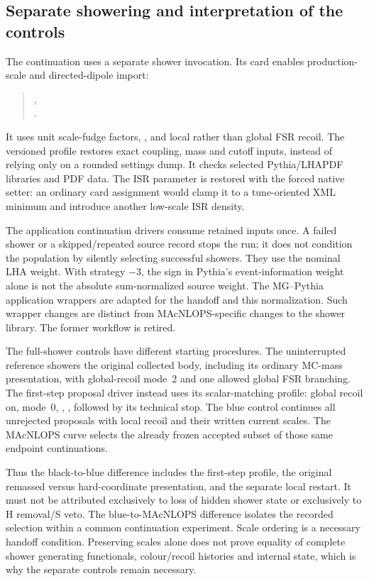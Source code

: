 \subsection{Separate showering and interpretation of the controls}
\label{sec:masses-full-shower}

The continuation uses a separate shower invocation.
Its card enables production-scale and directed-dipole import:
\begin{quote}
,\\
.
\end{quote}
It uses unit scale-fudge factors, , and local
rather than global FSR recoil.
The versioned profile restores exact coupling, mass and cutoff
inputs, instead of relying only on a rounded settings dump.
It checks selected Pythia/LHAPDF libraries and PDF data.
The ISR parameter  is restored with the
forced native setter: an ordinary card assignment would clamp it
to a tune-oriented XML minimum and introduce another low-scale
ISR density.

The application continuation drivers consume retained inputs once.
A failed shower or a skipped/repeated source record stops the run;
it does not condition the population by silently selecting successful
showers.
They use the nominal LHA weight.
With strategy $-3$, the sign in Pythia's event-information weight
alone is not the absolute sum-normalized source weight.
The MG--Pythia application wrappers are adapted for the handoff
and this normalization.
Such wrapper changes are distinct from MAcNLOPS-specific changes
to the shower library.
The former  workflow is retired.

The full-shower controls have different starting procedures.
The uninterrupted reference showers the original collected body,
including its ordinary MC-mass presentation, with global-recoil
mode~2 and one allowed global FSR branching.
The first-step proposal driver instead uses its scalar-matching
profile: global recoil on, mode~0,
,
, followed by its technical stop.
The blue control continues all unrejected proposals with local
recoil and their written current scales.
The MAcNLOPS curve selects the already frozen accepted subset
of those same endpoint continuations.

Thus the black-to-blue difference includes the first-step profile,
the original remassed versus hard-coordinate presentation, and
the separate local restart.
It must not be attributed exclusively to loss of hidden shower
state or exclusively to H removal/S veto.
The blue-to-MAcNLOPS difference isolates the recorded selection
within a common continuation experiment.
Scale ordering is a necessary handoff condition.
Preserving scales alone does not prove equality of complete
shower generating functionals, colour/recoil histories and internal
state, which is why the separate controls remain necessary.
